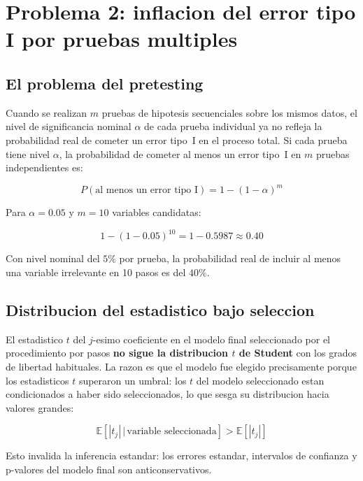 \documentclass[12pt, letterpaper]{article}
\theoremstyle{remark}
\newcommand{\E}{\mathbb{E}}
\begin{document}
\section{Problema 2: inflacion del error tipo I por pruebas multiples}

\subsection{El problema del pretesting}

Cuando se realizan $m$ pruebas de hipotesis secuenciales sobre los mismos
datos, el nivel de significancia nominal $\alpha$ de cada prueba individual
ya no refleja la probabilidad real de cometer un error tipo~I en el proceso
total. Si cada prueba tiene nivel $\alpha$, la probabilidad de cometer al
menos un error tipo~I en $m$ pruebas independientes es:

\begin{equation}
  P(\text{al menos un error tipo I}) = 1 - (1-\alpha)^m
  \label{eq:bonferroni}
\end{equation}

Para $\alpha = 0.05$ y $m = 10$ variables candidatas:

\begin{equation}
  1 - (1-0.05)^{10} = 1 - 0.5987 \approx 0.40
  \label{eq:tipo1_10}
\end{equation}

Con nivel nominal del $5\%$ por prueba, la probabilidad real de incluir al
menos una variable irrelevante en 10 pasos es del $40\%$.

\subsection{Distribucion del estadistico bajo seleccion}

El estadistico $t$ del $j$-esimo coeficiente en el modelo final seleccionado
por el procedimiento por pasos \textbf{no sigue la distribucion $t$ de Student}
con los grados de libertad habituales. La razon es que el modelo fue elegido
precisamente porque los estadisticos $t$ superaron un umbral: los $t$ del
modelo seleccionado estan condicionados a haber sido seleccionados, lo que
sesga su distribucion hacia valores grandes:

\begin{equation}
  \E[|t_j| \,|\, \text{variable seleccionada}] > \E[|t_j|]
  \label{eq:t_sesgado}
\end{equation}

Esto invalida la inferencia estandar: los errores estandar, intervalos de
confianza y p-valores del modelo final son anticonservativos.
\end{document}
